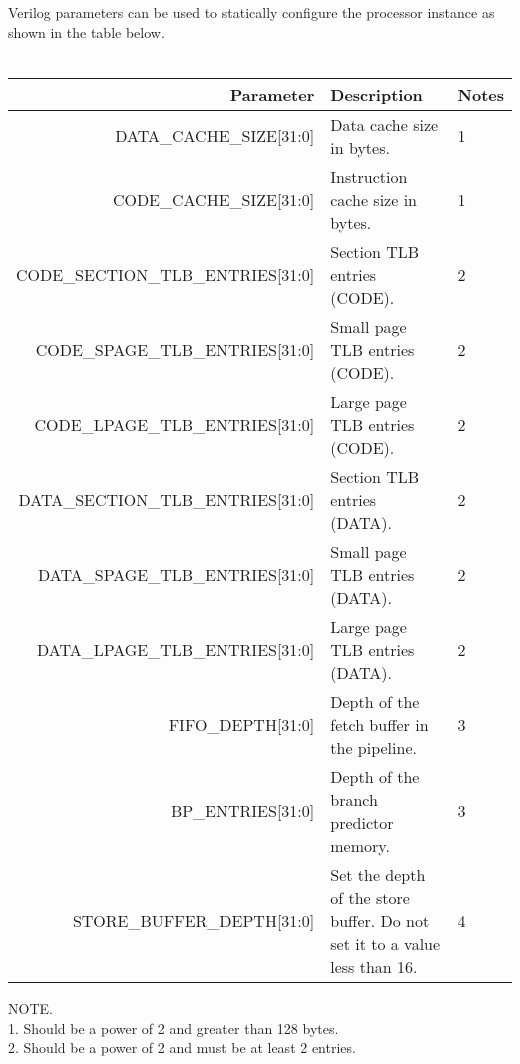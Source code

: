 \documentclass[10pt]{article}
\begin{document}
\\
\\
Verilog parameters can be used to statically configure the processor instance
as shown in the table below.
\\
\\
\begin{tabularx}{\linewidth}{|r|X|X|}
\hline
Parameter &
Description &
Notes \\ \hline

DATA\_CACHE\_SIZE[31:0] &
Data cache size in bytes. &
1 \\ \hline

CODE\_CACHE\_SIZE[31:0] &
Instruction cache size in bytes. &
1 \\ \hline

CODE\_SECTION\_TLB\_ENTRIES[31:0] &
Section TLB entries (CODE). &
2 \\ \hline

CODE\_SPAGE\_TLB\_ENTRIES[31:0] &
Small page TLB entries (CODE). &
2 \\ \hline

CODE\_LPAGE\_TLB\_ENTRIES[31:0] &
Large page TLB entries (CODE). &
2 \\ \hline

DATA\_SECTION\_TLB\_ENTRIES[31:0] &
Section TLB entries (DATA). &
2 \\ \hline

DATA\_SPAGE\_TLB\_ENTRIES[31:0] &
Small page TLB entries (DATA). &
2 \\ \hline

DATA\_LPAGE\_TLB\_ENTRIES[31:0] &
Large page TLB entries (DATA). &
2 \\ \hline

FIFO\_DEPTH[31:0] &
Depth of the fetch buffer in the pipeline. &
3 \\ \hline

BP\_ENTRIES[31:0] &
Depth of the branch predictor memory. &
3 \\ \hline

STORE\_BUFFER\_DEPTH[31:0] &
Set the depth of the store buffer. Do not set it to a value less than 16. &
4  \\ \hline
\end{tabularx}

NOTE. \\

1. Should be a power of 2 and greater than 128 bytes. \\

2. Should be a power of 2 and must be at least 2 entries. \\
 
\end{document}
